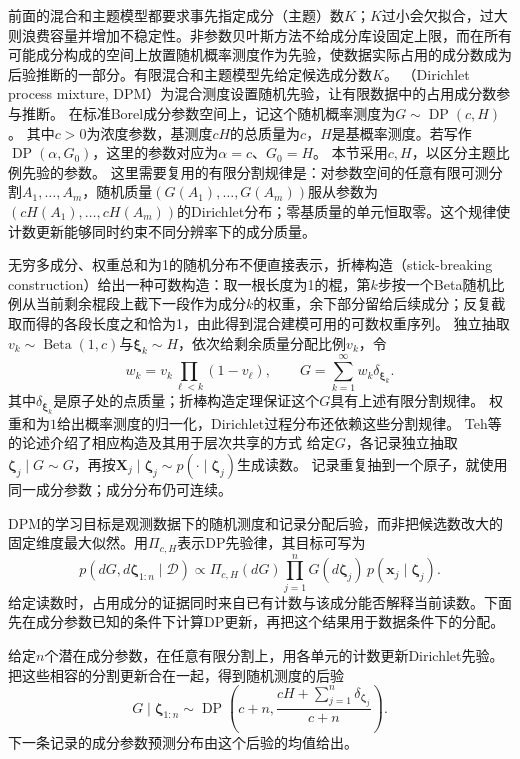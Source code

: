 前面的混合和主题模型都要求事先指定成分（主题）数$K$；$K$过小会欠拟合，过大则浪费容量并增加不稳定性。非参数贝叶斯方法不给成分库设固定上限，而在所有可能成分构成的空间上放置随机概率测度作为先验，使数据实际占用的成分数成为后验推断的一部分。有限混合和主题模型先给定候选成分数$K$。
（Dirichlet process mixture, DPM）为混合测度设置随机先验，让有限数据中的占用成分数参与推断。
在标准Borel成分参数空间上，记这个随机概率测度为$G\sim\operatorname{DP}(c,H)$。
其中$c>0$为浓度参数，基测度$cH$的总质量为$c$，$H$是基概率测度。若写作$\operatorname{DP}(\alpha,G_0)$，这里的参数对应为$\alpha=c$、$G_0=H$。
本节采用$c,H$，以区分主题比例先验的参数。
这里需要复用的有限分割规律是：对参数空间的任意有限可测分割$A_1,\ldots,A_m$，随机质量$(G(A_1),\ldots,G(A_m))$服从参数为$(cH(A_1),\ldots,cH(A_m))$的Dirichlet分布；零基质量的单元恒取零。这个规律使计数更新能够同时约束不同分辨率下的成分质量。


无穷多成分、权重总和为1的随机分布不便直接表示，折棒构造（stick-breaking construction）给出一种可数构造：取一根长度为1的棍，第$k$步按一个Beta随机比例从当前剩余棍段上截下一段作为成分$k$的权重，余下部分留给后续成分；反复截取而得的各段长度之和恰为1，由此得到混合建模可用的可数权重序列。
独立抽取$v_k\sim\operatorname{Beta}(1,c)$与$\bm\xi_k\sim H$，依次给剩余质量分配比例$v_k$，令
\[
  w_k=v_k\prod_{\ell<k}(1-v_\ell),\qquad
  G=\sum_{k=1}^{\infty}w_k\delta_{\bm{\xi}_k}.
\]
其中$\delta_{\bm\xi_k}$是原子处的点质量；折棒构造定理保证这个$G$具有上述有限分割规律。
权重和为$1$给出概率测度的归一化，Dirichlet过程分布还依赖这些分割规律。
Teh等的论述介绍了相应构造及其用于层次共享的方式
给定$G$，各记录独立抽取$\bm\zeta_j\mid G\sim G$，再按$\bm X_j\mid\bm\zeta_j\sim p(\cdot\mid\bm\zeta_j)$生成读数。
记录重复抽到一个原子，就使用同一成分参数；成分分布仍可连续。

DPM的学习目标是观测数据下的随机测度和记录分配后验，而非把候选数改大的固定维度最大似然。用$\Pi_{c,H}$表示DP先验律，其目标可写为
\begin{equation}
 p(dG,d\bm\zeta_{1:n}\mid\mathcal D)
 \propto \Pi_{c,H}(dG)\prod_{j=1}^n
       G(d\bm\zeta_j)\,p(\bm x_j\mid\bm\zeta_j).
 \label{eq:pgm-static-directed-dpm-posterior}
\end{equation}
给定读数时，占用成分的证据同时来自已有计数与该成分能否解释当前读数。下面先在成分参数已知的条件下计算DP更新，再把这个结果用于数据条件下的分配。

给定$n$个潜在成分参数，在任意有限分割上，用各单元的计数更新Dirichlet先验。
把这些相容的分割更新合在一起，得到随机测度的后验
\[
  G\mid\bm\zeta_{1:n}\sim\operatorname{DP}
    \left(c+n,\frac{cH+\sum_{j=1}^n\delta_{\bm\zeta_j}}{c+n}\right).
\]
下一条记录的成分参数预测分布由这个后验的均值给出。

